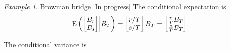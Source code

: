 \documentclass[12pt,a4paper]{amsart}
\theoremstyle{plain}%
\theoremstyle{definition}
\theoremstyle{remark}
\newtheorem{example}{Example}
\begin{document}
\begin{example}{Brownian bridge} [In progress]
The conditional expectation is
\begin{equation*}
  \operatorname{E}\left(\begin{bmatrix}
    B_r \\ B_s
  \end{bmatrix} \middle| B_T\right) = \begin{bmatrix}
      r/T \\ s/T
    \end{bmatrix} B_T = \begin{bmatrix}
      \frac r T B_T \\ \frac sT B_T
    \end{bmatrix} 
\end{equation*}

The conditional variance is 
\end{example}


\vfill

%

\end{document}
